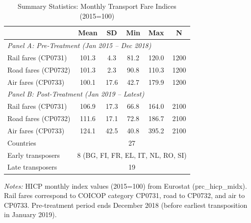 \begin{table}[htbp]
\centering
\caption{Summary Statistics: Monthly Transport Fare Indices (2015=100)}
\label{tab:summary}
\begin{tabular}{lccccc}
\hline\hline
 & Mean & SD & Min & Max & N \\
\hline
\multicolumn{6}{l}{\textit{Panel A: Pre-Treatment (Jan 2015 -- Dec 2018)}} \\[3pt]
Rail fares (CP0731) & 101.3 & 4.3 & 81.2 & 120.0 & 1200 \\
Road fares (CP0732) & 101.3 & 2.3 & 90.8 & 110.3 & 1200 \\
Air fares (CP0733) & 100.1 & 17.6 & 42.7 & 179.9 & 1200 \\

\multicolumn{6}{l}{\textit{Panel B: Post-Treatment (Jan 2019 -- Latest)}} \\[3pt]
Rail fares (CP0731) & 106.9 & 17.3 & 66.8 & 164.0 & 2100 \\
Road fares (CP0732) & 111.6 & 17.1 & 72.8 & 186.7 & 2100 \\
Air fares (CP0733) & 124.1 & 42.5 & 40.8 & 395.2 & 2100 \\
\hline
Countries & \multicolumn{5}{c}{27} \\
Early transposers & \multicolumn{5}{c}{8 (BG, FI, FR, EL, IT, NL, RO, SI)} \\
Late transposers & \multicolumn{5}{c}{19} \\
\hline\hline
\end{tabular}
\begin{tablenotes}[flushleft]\footnotesize
\item \textit{Notes:} HICP monthly index values (2015=100) from Eurostat (prc\_hicp\_midx). Rail fares correspond to COICOP category CP0731, road to CP0732, and air to CP0733. Pre-treatment period ends December 2018 (before earliest transposition in January 2019).
\end{tablenotes}
\end{table}
